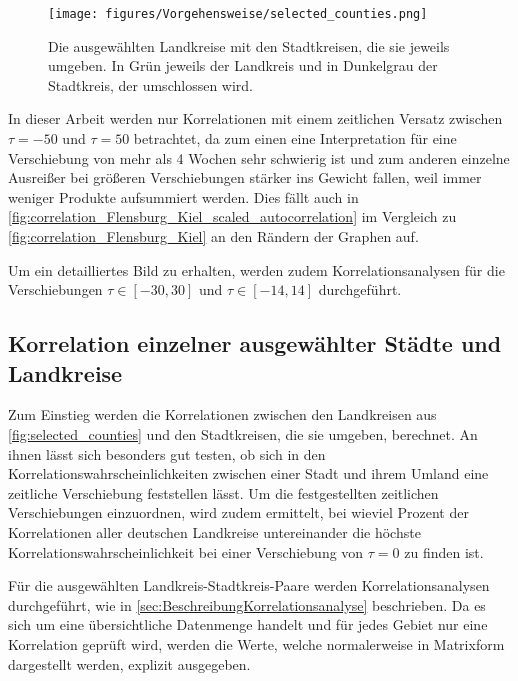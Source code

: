 \begin{figure}[H]
    \centering
    \texttt{[image: figures/Vorgehensweise/selected\_counties.png]}
    \caption{Die ausgewählten Landkreise mit den Stadtkreisen, die sie jeweils umgeben. In Grün jeweils der Landkreis und in Dunkelgrau der Stadtkreis, der umschlossen wird.}
    \label{fig:selected_counties}
\end{figure}
In dieser Arbeit werden nur Korrelationen mit einem zeitlichen Versatz zwischen $\tau=-50$ und $\tau=50$ betrachtet, da zum einen eine Interpretation für eine Verschiebung von mehr als 4 Wochen sehr schwierig ist und zum anderen einzelne Ausreißer bei größeren Verschiebungen stärker ins Gewicht fallen, weil immer weniger Produkte aufsummiert werden. Dies fällt auch in \autoref{fig:correlation_Flensburg_Kiel_scaled_autocorrelation} im Vergleich zu \autoref{fig:correlation_Flensburg_Kiel} an den Rändern der Graphen auf.

Um ein detailliertes Bild zu erhalten, werden zudem Korrelationsanalysen für die Verschiebungen $\tau\in[-30,30]$ und $\tau\in[-14,14]$ durchgeführt.

\subsection{Korrelation einzelner ausgewählter Städte und Landkreise}\label{sec:selected_counties}
Zum Einstieg werden die Korrelationen zwischen den Landkreisen aus \autoref{fig:selected_counties} und den Stadtkreisen, die sie umgeben, berechnet.
An ihnen lässt sich besonders gut testen, ob sich in den Korrelationswahrscheinlichkeiten zwischen einer Stadt und ihrem Umland eine zeitliche Verschiebung feststellen lässt.
Um die festgestellten zeitlichen Verschiebungen einzuordnen, wird zudem ermittelt, bei wieviel Prozent der Korrelationen aller deutschen Landkreise untereinander die höchste Korrelationswahrscheinlichkeit bei einer Verschiebung von $\tau = 0$ zu finden ist.

Für die ausgewählten Landkreis-Stadtkreis-Paare werden Korrelationsanalysen durchgeführt, wie in \autoref{sec:BeschreibungKorrelationsanalyse} beschrieben. Da es sich um eine übersichtliche Datenmenge handelt und für jedes Gebiet nur eine Korrelation geprüft wird, werden die Werte, welche normalerweise in Matrixform dargestellt werden, explizit ausgegeben.

